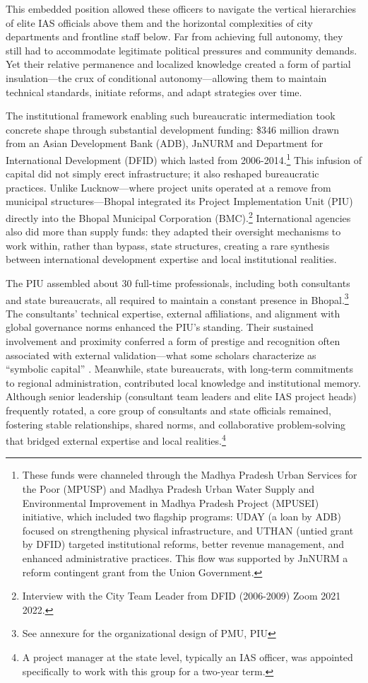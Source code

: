 This embedded position allowed these officers to navigate the vertical hierarchies of elite IAS officials above them and the horizontal complexities of city departments and frontline staff below. Far from achieving full autonomy, they still had to accommodate legitimate political pressures and community demands. Yet their relative permanence and localized knowledge created a form of partial insulation—the crux of conditional autonomy—allowing them to maintain technical standards, initiate reforms, and adapt strategies over time.

The institutional framework enabling such bureaucratic intermediation took concrete shape through substantial development funding: \$346 million drawn from an Asian Development Bank (ADB), JnNURM and Department for International Development (DFID) which lasted from 2006-2014.\footnote{These funds were channeled through the Madhya Pradesh Urban Services for the Poor (MPUSP) and Madhya Pradesh Urban Water Supply and Environmental Improvement in Madhya Pradesh Project (MPUSEI) initiative, which included two flagship programs: UDAY (a loan by ADB) focused on strengthening physical infrastructure, and UTHAN (untied grant by DFID) targeted institutional reforms, better revenue management, and enhanced administrative practices. This flow was supported by JnNURM a reform contingent grant from the Union Government.} This infusion of capital did not simply erect infrastructure; it also reshaped bureaucratic practices.  Unlike Lucknow—where project units operated at a remove from municipal structures—Bhopal integrated its Project Implementation Unit (PIU) directly into the Bhopal Municipal Corporation (BMC).\footnote{Interview with the City Team Leader from DFID (2006-2009) Zoom 2021 2022.} International agencies also did more than supply funds: they adapted their oversight mechanisms to work within, rather than bypass, state structures, creating a rare synthesis between international development expertise and local institutional realities. 

The PIU assembled about 30 full-time professionals, including both consultants and state bureaucrats, all required to maintain a constant presence in Bhopal.\footnote{See annexure for the organizational design of PMU, PIU} The consultants’ technical expertise, external affiliations, and alignment with global governance norms enhanced the PIU’s standing. Their sustained involvement and proximity conferred a form of prestige and recognition often associated with external validation—what some scholars characterize as “symbolic capital” \citep{bourdieu_forms_1986}. Meanwhile, state bureaucrats, with long-term commitments to regional administration, contributed local knowledge and institutional memory. Although senior leadership (consultant team leaders and elite IAS project heads) frequently rotated, a core group of consultants and state officials remained, fostering stable relationships, shared norms, and collaborative problem-solving that bridged external expertise and local realities.\footnote{A project manager at the state level, typically an IAS officer, was appointed specifically to work with this group for a two-year term.}

